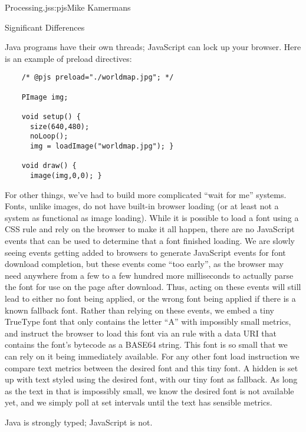 \begin{aosachapter}{Processing.js}{s:pjs}{Mike Kamermans}
\begin{aosasect1}{Significant Differences}
\begin{aosasect3}{Java programs have their own threads; JavaScript can lock up your browser.}
Here is an example of preload directives:

\begin{verbatim}
    /* @pjs preload="./worldmap.jpg"; */

    PImage img;

    void setup() {
      size(640,480);
      noLoop();
      img = loadImage("worldmap.jpg"); }

    void draw() {
      image(img,0,0); }
\end{verbatim}

For other things, we've had to build more complicated ``wait for me''
systems. Fonts, unlike images, do not have built-in browser loading
(or at least not a system as functional as image loading). While it is
possible to load a font using a CSS  rule and rely on
the browser to make it all happen, there are no JavaScript events that
can be used to determine that a font finished loading. We are slowly
seeing events getting added to browsers to generate JavaScript events
for font download completion, but these events come ``too early'', as
the browser may need anywhere from a few to a few hundred more
milliseconds to actually parse the font for use on the page after
download. Thus, acting on these events will still lead to either no
font being applied, or the wrong font being applied if there is a
known fallback font. Rather than relying on these events, we embed
a tiny TrueType font that only contains the letter ``A'' with
impossibly small metrics, and instruct the browser to load this font
via an  rule with a data URI that contains the font's
bytecode as a BASE64 string. This font is so small that we can rely on
it being immediately available. For any other font load
instruction we compare text metrics between the desired font and this
tiny font. A hidden  is set up with text styled using the desired
font, with our tiny font as fallback. As long as the text in that 
is impossibly small, we know the desired font is not available yet,
and we simply poll at set intervals until the
text has sensible metrics.

\end{aosasect3}

\begin{aosasect3}{Java is strongly typed; JavaScript is not.}


\end{aosasect3}
\end{aosasect1}
\end{aosachapter}
